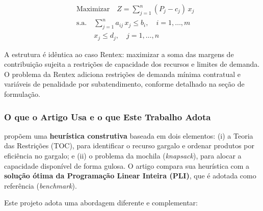 \begin{align}
  &\text{Maximizar} \quad Z = \sum_{j=1}^{n} (P_j - c_j)\, x_j \nonumber \\
  &\text{s.a.} \quad \sum_{j=1}^{n} a_{ij}\, x_j \leq b_i, \quad i = 1, \ldots, m \nonumber \\
  &\phantom{\text{s.a.}} \quad x_j \leq d_j, \quad j = 1, \ldots, n \nonumber
\end{align}

A estrutura é idêntica ao caso Rentex: maximizar a soma das margens de contribuição
sujeita a restrições de capacidade dos recursos e limites de demanda. O problema
da Rentex adiciona restrições de demanda mínima contratual e variáveis de
penalidade por subatendimento, conforme detalhado na seção de formulação.

\subsubsection{O que o Artigo Usa e o que Este Trabalho Adota}

\textcite{sobreiro2013} propõem uma \textbf{heurística construtiva} baseada em
dois elementos: (i) a Teoria das Restrições (TOC), para identificar o recurso
gargalo e ordenar produtos por eficiência no gargalo; e (ii) o problema da
mochila (\textit{knapsack}), para alocar a capacidade disponível de forma gulosa.
O artigo compara sua heurística com a \textbf{solução ótima da Programação Linear
Inteira (PLI)}, que é adotada como referência (\textit{benchmark}).

Este projeto adota uma abordagem diferente e complementar:

